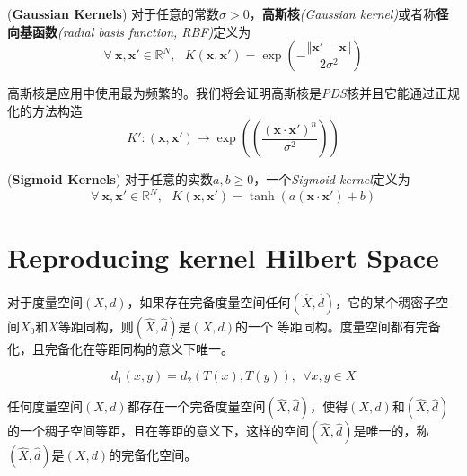 \begin{example}
    (\textbf{Gaussian Kernels})\hspace*{0.5em} 对于任意的常数$\sigma>0$，\textbf{高斯核}\textsl{(Gaussian kernel)}或者称\textbf{径向基函数}\textsl{(radial basis function, RBF)}定义为
    \begin{equation}
        \forall\ \mathbf{x},\mathbf{x}'\in \mathbb{R}^N,\ \ \ K(\mathbf{x},\mathbf{x}')=\exp\left(-\frac{\Vert \mathbf{x}'-\mathbf{x}\Vert}{2\sigma^2}\right)
    \end{equation}

    高斯核是应用中使用最为频繁的。我们将会证明高斯核是\textsl{PDS}核并且它能通过正规化的方法构造
    \begin{equation}
        K':(\mathbf{x},\mathbf{x}')\rightarrow \exp((\frac{(\mathbf{x}\cdot \mathbf{x}')^n}{\sigma^2}))
    \end{equation}
\end{example}
\begin{example}
    (\textbf{Sigmoid Kernels})\hspace*{0.5em} 对于任意的实数$a,b\geqslant 0$，一个\textsl{Sigmoid kernel}定义为
    \begin{equation}
        \forall\ \mathbf{x},\mathbf{x}'\in \mathbb{R}^N,\ \ \ K(\mathbf{x},\mathbf{x}')=\tanh\left(a(\mathbf{x}\cdot \mathbf{x}')+b\right)
    \end{equation}
\end{example}

\section{Reproducing kernel Hilbert Space}

对于度量空间$(X,d)$，如果存在完备度量空间任何$(\hat{X},\hat{d})$，它的某个稠密子空间$X_0$和$X$等距同构，则$(\hat{X},\hat{d})$是$(X,d)$的一个
等距同构。度量空间都有完备化，且完备化在等距同构的意义下唯一。

\begin{equation}
    d_1(x,y)=d_2(T(x),T(y)),\ \ \forall x,y\in X
\end{equation}

\begin{mdframed}
    \begin{theorem}
        任何度量空间$(X,d)$都存在一个完备度量空间$(\hat{X},\hat{d})$，使得$(X,d)$和$(\hat{X},\hat{d})$的一个稠子空间等距，且在等距的意义下，这样的空间$(\hat{X},\hat{d})$是唯一的，称
        $(\hat{X},\hat{d})$是$(X,d)$的完备化空间。
    \end{theorem}
\end{mdframed}

